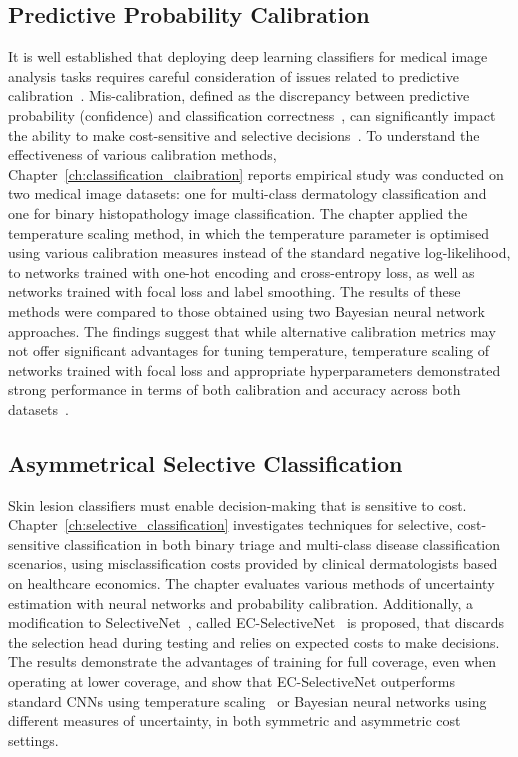 \subsection*{Predictive Probability Calibration}
It is well established that deploying deep learning classifiers for medical image analysis tasks requires careful consideration of issues related to predictive calibration~\citep{maron2019systematic}. Mis-calibration, defined as the discrepancy between predictive probability (confidence) and classification correctness~\citep{guo2017calibration}, can significantly impact the ability to make cost-sensitive and selective decisions~\citep{carse2021robust}. To understand the effectiveness of various calibration methods, Chapter~\ref{ch:classification_claibration} reports empirical study was conducted on two medical image datasets: one for multi-class dermatology classification and one for binary histopathology image classification. The chapter applied the temperature scaling method, in which the temperature parameter is optimised using various calibration measures instead of the standard negative log-likelihood, to networks trained with one-hot encoding and cross-entropy loss, as well as networks trained with focal loss and label smoothing. The results of these methods were compared to those obtained using two Bayesian neural network approaches. The findings suggest that while alternative calibration metrics may not offer significant advantages for tuning temperature, temperature scaling of networks trained with focal loss and appropriate hyperparameters demonstrated strong performance in terms of both calibration and accuracy across both datasets~\citep{carse2022calibration}.

\subsection*{Asymmetrical Selective Classification}
Skin lesion classifiers must enable decision-making that is sensitive to cost. Chapter~\ref{ch:selective_classification} investigates techniques for selective, cost-sensitive classification in both binary triage and multi-class disease classification scenarios, using misclassification costs provided by clinical dermatologists based on healthcare economics. The chapter evaluates various methods of uncertainty estimation with neural networks and probability calibration. Additionally, a modification to SelectiveNet~\citep{geifman2019selectivenet}, called EC-SelectiveNet~\citep{carse2021robust} is proposed, that discards the selection head during testing and relies on expected costs to make decisions. The results demonstrate the advantages of training for full coverage, even when operating at lower coverage, and show that EC-SelectiveNet outperforms standard CNNs using temperature scaling~\citep{guo2017calibration} or Bayesian neural networks using different measures of uncertainty, in both symmetric and asymmetric cost settings.

